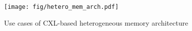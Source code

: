 \begin{figure}[t]
  \centering
  \texttt{[image: fig/hetero\_mem\_arch.pdf]}
  \caption{Use cases of CXL-based heterogeneous memory architecture}
  \label{fig:cxl_mem_overview}
\end{figure}